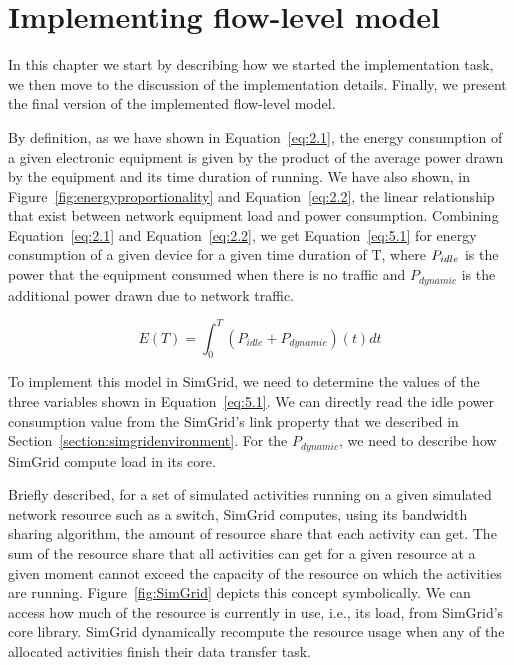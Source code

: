 \chapter{Implementing flow-level model}
\label{chapter:implementation}

In this chapter we start by describing how we started the implementation task, we then move to the discussion of the implementation details. Finally, we present the final version of the implemented flow-level model. 

By definition, as we have shown in Equation~\ref{eq:2.1}, the energy consumption of a given electronic equipment is given by the product of the average power drawn by the equipment and its time duration of running. We have also shown, in Figure~\ref{fig:energyproportionality} and Equation~\ref{eq:2.2}, the linear relationship that exist between network equipment load and power consumption. Combining Equation~\ref{eq:2.1} and Equation~\ref{eq:2.2}, we get Equation~\ref{eq:5.1} for energy consumption of a given device for a given time duration of T, where \($$P_{idle}$$\) is the power that the equipment consumed when there is no traffic and \(P_{dynamic}\) is the additional power drawn due to network traffic.

\begin{equation} \label{eq:5.1}
E(T) =  \int_{0}^{T} (P_{idle} + P_{dynamic})(t) dt 
\end{equation} 

To implement this model in SimGrid, we need to determine the values of the three variables shown in Equation~\ref{eq:5.1}. We can directly read the idle power consumption value from the SimGrid's link property that we described in Section~\ref{section:simgridenvironment}. For the \(P_{dynamic}\), we need to describe how SimGrid compute load in its core. 

Briefly described, for a set of simulated activities running on a given simulated network resource such as a switch, SimGrid computes, using its bandwidth sharing algorithm, the amount of resource share that each activity can get. The sum of the resource share that all activities can get for a given resource at a given moment cannot exceed the capacity of the resource on which the activities are running. Figure~\ref{fig:SimGrid} depicts this concept symbolically. We can access how much of the resource is currently in use, i.e., its load, from SimGrid's core library. SimGrid dynamically recompute the resource usage when any of the allocated activities finish their data transfer task. 


